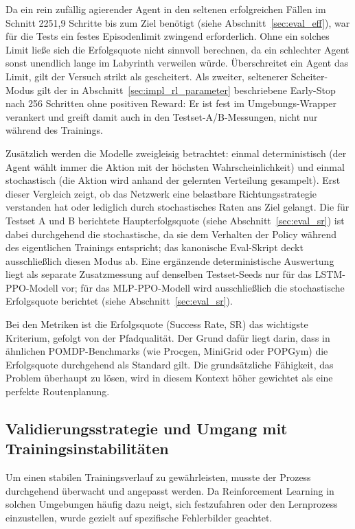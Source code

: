 \documentclass[
  a4paper,
  11pt,
  twoside,
  BCOR=8mm,           %
  headings=big,
  numbers=noenddot,
  listof=totoc,       %
  captions=tableheading,
]{scrreprt}
\begin{document}
Da ein rein zufällig agierender Agent in den seltenen erfolgreichen Fällen im Schnitt 2251,9 Schritte bis zum Ziel benötigt (siehe Abschnitt~\ref{sec:eval_eff}), war für die Tests ein festes Episodenlimit zwingend erforderlich. Ohne ein solches Limit ließe sich die Erfolgsquote nicht sinnvoll berechnen, da ein schlechter Agent sonst unendlich lange im Labyrinth verweilen würde. Überschreitet ein Agent das Limit, gilt der Versuch strikt als gescheitert. Als zweiter, seltenerer Scheiter-Modus gilt der in Abschnitt~\ref{sec:impl_rl_parameter} beschriebene Early-Stop nach 256 Schritten ohne positiven Reward: Er ist fest im Umgebungs-Wrapper verankert und greift damit auch in den Testset-A/B-Messungen, nicht nur während des Trainings. 

Zusätzlich werden die Modelle zweigleisig betrachtet: einmal deterministisch (der Agent wählt immer die Aktion mit der höchsten Wahrscheinlichkeit) und einmal stochastisch (die Aktion wird anhand der gelernten Verteilung gesampelt). Erst dieser Vergleich zeigt, ob das Netzwerk eine belastbare Richtungsstrategie verstanden hat oder lediglich durch stochastisches Raten ans Ziel gelangt. Die für Testset A und B berichtete Haupterfolgsquote (siehe Abschnitt~\ref{sec:eval_sr}) ist dabei durchgehend die stochastische, da sie dem Verhalten der Policy während des eigentlichen Trainings entspricht; das kanonische Eval-Skript deckt ausschließlich diesen Modus ab. Eine ergänzende deterministische Auswertung liegt als separate Zusatzmessung auf denselben Testset-Seeds nur für das LSTM-PPO-Modell vor; für das MLP-PPO-Modell wird ausschließlich die stochastische Erfolgsquote berichtet (siehe Abschnitt~\ref{sec:eval_sr}).

Bei den Metriken ist die Erfolgsquote (Success Rate, SR) das wichtigste Kriterium, gefolgt von der Pfadqualität. Der Grund dafür liegt darin, dass in ähnlichen POMDP-Benchmarks (wie Procgen, MiniGrid oder POPGym) die Erfolgsquote durchgehend als Standard gilt. Die grundsätzliche Fähigkeit, das Problem überhaupt zu lösen, wird in diesem Kontext höher gewichtet als eine perfekte Routenplanung.

\subsection{Validierungsstrategie und Umgang mit Trainingsinstabilitäten}
\label{sec:methodik_iteration}

Um einen stabilen Trainingsverlauf zu gewährleisten, musste der Prozess durchgehend überwacht und angepasst werden. Da Reinforcement Learning in solchen Umgebungen häufig dazu neigt, sich festzufahren oder den Lernprozess einzustellen, wurde gezielt auf spezifische Fehlerbilder geachtet.
\end{document}
